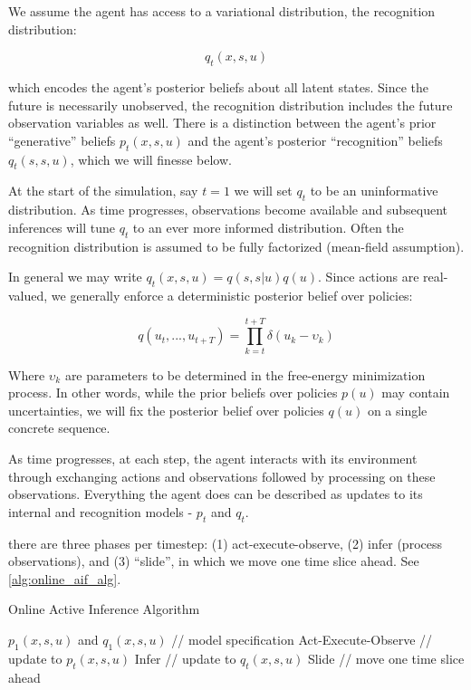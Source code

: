 \documentclass{article}
\begin{document}
We assume the agent has access to a variational distribution, the recognition distribution:

\begin{equation}\label{eq:3}
q_t(x, s, u)
\end{equation}

which encodes the agent's posterior beliefs about all latent states. Since the future is necessarily unobserved, the recognition distribution includes the future observation variables as well. There is a distinction between the agent's prior ``generative'' beliefs $p_t(x, s, u)$ and the agent's posterior ``recognition'' beliefs $q_t(s, s, u)$, which we will finesse below. 

At the start of the simulation, say $t = 1$ we will set $q_t$ to be an uninformative distribution. As time progresses, observations become available and subsequent inferences will tune $q_t$ to an ever more informed distribution. Often the recognition distribution is assumed to be fully factorized (mean-field assumption).

In general we may write $q_t(x, s, u) = q(s, s | u)q(u)$. Since actions are real-valued, we generally enforce a deterministic posterior belief over policies: 

\begin{equation}\label{eq:4}
q(u_t, ..., u_{t + T}) = \prod_{k = t}^{t + T}\delta(u_k - \upsilon_k)
\end{equation} 

Where $\upsilon_k$ are parameters to be determined in the free-energy minimization process. In other words, while the prior beliefs over policies $p(u)$ may contain uncertainties, we will fix the posterior belief over policies $q(u)$ on a single concrete sequence.

As time progresses, at each step, the agent interacts with its environment through exchanging actions and observations followed by processing on these observations. Everything the agent does can be described as updates to its internal and recognition models - $p_t$ and $q_t$. 

there are three phases per timestep: (1) act-execute-observe, (2) infer (process observations), and (3) ``slide'', in which we move one time slice ahead. See \ref{alg:online_aif_alg}.

\begin{algorithm}
\caption{Online Active Inference Algorithm}
\label{alg:online_aif_alg}
\begin{algorithmic}[1]
\Require $p_1(x, s, u)$ and $q_1(x, s, u)$ // model specification
    \State Act-Execute-Observe // update to $p_t(x, s, u)$
    \State Infer // update to $q_t(x, s, u)$
    \State Slide // move one time slice ahead
\EndFor
\end{algorithmic}
\end{algorithm}
\end{document}
